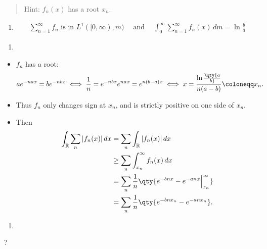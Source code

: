 \begin{quote}
Hint: \(f_n(x)\) has a root \(x_n\).
\end{quote}

\begin{enumerate}
\def\labelenumi{\alph{enumi}.}
\setcounter{enumi}{1}
\tightlist
\item

  \begin{align*}
  \sum_{n=1}^{\infty} f_{n} \text { is in } L^{1}([0, \infty), m) 
  {\quad \operatorname{and} \quad}
  \int _{0}^{\infty} \sum _{n=1}^{\infty} f_{n}(x) \,dm = \ln \frac{b}{a}
  \end{align*}
   
\end{enumerate}

\begin{solution}

\envlist

\begin{concept}

\envlist

\end{concept}

\begin{enumerate}
\def\labelenumi{\alph{enumi}.}
\tightlist
\item
\end{enumerate}

\begin{itemize}
\item
  \(f_n\) has a root:
  \begin{align*}  
  ae^{-nax} = be^{-nbx} 
  &\iff {1\over n} = e^{-nbx} e^{nax} = e^{n(b-a)x}
  \iff x = {\ln\qty{a\over b} \over n(a-b)} \coloneqq x_n
  .\end{align*}
\item
  Thus \(f_n\) only changes sign at \(x_n\), and is strictly positive on
  one side of \(x_n\).
\item
  Then
  \begin{align*}  
  \int_{\mathbb{R}}\sum_n {\left\lvert {f_n(x)} \right\rvert}\,dx 
  &= \sum_n \int_{\mathbb{R}}{\left\lvert {f_n(x)} \right\rvert} \,dx \\
  &\geq \sum_n \int_{x_n}^\infty f_n(x) \, dx \\
  &= \sum_n {1\over n} \qty{ e^{-bnx} - e^{-anx}\Big|_{x_n}^\infty } \\
  &= \sum_n {1\over n} \qty{ e^{-bnx_n} - e^{-anx_n} }
  .\end{align*}
\end{itemize}

\begin{enumerate}
\def\labelenumi{\alph{enumi}.}
\setcounter{enumi}{1}
\tightlist
\item
\end{enumerate}

?

\end{solution}

